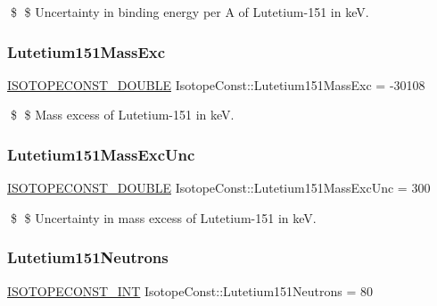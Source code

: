 \$ \$ Uncertainty in binding energy per A of Lutetium-\/151 in keV. \mbox{\label{group___isotope_const-_lutetium-_lu151_ga3619118c7715f7bee0afcdbccd0d39b0}} 
\subsubsection{\texorpdfstring{Lutetium151\+Mass\+Exc}{Lutetium151MassExc}}
{\footnotesize\ttfamily \mbox{\hyperlink{group___isotope_const-_macros_ga8f45a7272ce02c0b4c65c44636ed719a}{I\+S\+O\+T\+O\+P\+E\+C\+O\+N\+S\+T\+\_\+\+D\+O\+U\+B\+LE}} Isotope\+Const\+::\+Lutetium151\+Mass\+Exc = -\/30108}

\$ \$ Mass excess of Lutetium-\/151 in keV. \mbox{\label{group___isotope_const-_lutetium-_lu151_gaca33338cf88482ce931f3b65823d052b}} 
\subsubsection{\texorpdfstring{Lutetium151\+Mass\+Exc\+Unc}{Lutetium151MassExcUnc}}
{\footnotesize\ttfamily \mbox{\hyperlink{group___isotope_const-_macros_ga8f45a7272ce02c0b4c65c44636ed719a}{I\+S\+O\+T\+O\+P\+E\+C\+O\+N\+S\+T\+\_\+\+D\+O\+U\+B\+LE}} Isotope\+Const\+::\+Lutetium151\+Mass\+Exc\+Unc = 300}

\$ \$ Uncertainty in mass excess of Lutetium-\/151 in keV. \mbox{\label{group___isotope_const-_lutetium-_lu151_gae2bd0b965a56dfcf9464d304583c7c20}} 
\subsubsection{\texorpdfstring{Lutetium151\+Neutrons}{Lutetium151Neutrons}}
{\footnotesize\ttfamily \mbox{\hyperlink{group___isotope_const-_macros_ga5f18360b3e99483a35c32d789e62621c}{I\+S\+O\+T\+O\+P\+E\+C\+O\+N\+S\+T\+\_\+\+I\+NT}} Isotope\+Const\+::\+Lutetium151\+Neutrons = 80}

